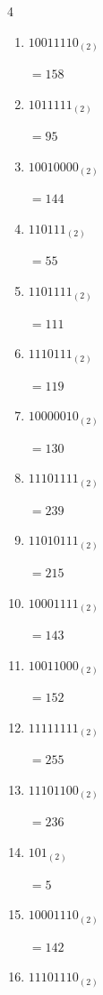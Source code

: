 \begin{multicols}{4}
\begin{enumerate}
        $=75$

  \item $10011110_{(2)}$

        $=158$

  \item $1011111_{(2)}$

        $=95$

  \item $10010000_{(2)}$

        $=144$

  \item $110111_{(2)}$

        $=55$

  \item $1101111_{(2)}$

        $=111$

  \item $1110111_{(2)}$

        $=119$

  \item $10000010_{(2)}$

        $=130$

  \item $11101111_{(2)}$

        $=239$

  \item $11010111_{(2)}$

        $=215$

  \item $10001111_{(2)}$

        $=143$

  \item $10011000_{(2)}$

        $=152$

\columnbreak %

  \item $11111111_{(2)}$

        $=255$

  \item $11101100_{(2)}$

        $=236$

  \item $101_{(2)}$

        $=5$

  \item $10001110_{(2)}$

        $=142$

  \item $11101110_{(2)}$


\end{enumerate}
\end{multicols}
